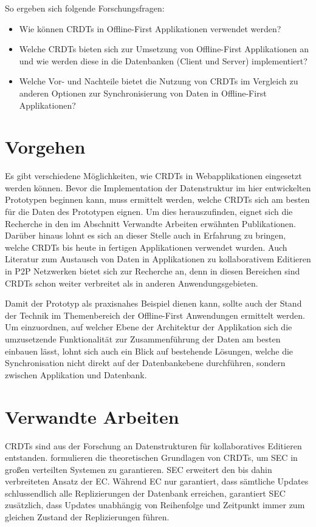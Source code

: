 \documentclass[a4paper, 12pt]{scrreprt}
\begin{document}
So ergeben sich folgende Forschungsfragen:

\begin{itemize}
	\item Wie können \acp{CRDT} in Offline-First Applikationen verwendet werden?
	\item Welche \acp{CRDT} bieten sich zur Umsetzung von Offline-First Applikationen an und wie werden diese in die Datenbanken (Client und Server) implementiert?
	\item Welche Vor- und Nachteile bietet die Nutzung von \acp{CRDT} im Vergleich zu anderen Optionen zur Synchronisierung von Daten in Offline-First Applikationen?
\end{itemize}

\section{Vorgehen}
Es gibt verschiedene Möglichkeiten, wie \acp{CRDT} in Webapplikationen eingesetzt werden können. Bevor die Implementation der Datenstruktur im hier entwickelten Prototypen beginnen kann, muss ermittelt werden, welche \acp{CRDT} sich am besten für die Daten des Prototypen eignen. Um dies herauszufinden, eignet sich die Recherche in den im Abschnitt Verwandte Arbeiten erwähnten Publikationen. Darüber hinaus lohnt es sich an dieser Stelle auch in Erfahrung zu bringen, welche \acp{CRDT} bis heute in fertigen Applikationen verwendet wurden. Auch Literatur zum Austausch von Daten in Applikationen zu kollaborativem Editieren in \ac{P2P} Netzwerken bietet sich zur Recherche an, denn in diesen Bereichen sind \acp{CRDT} schon weiter verbreitet als in anderen Anwendungsgebieten.

Damit der Prototyp als praxisnahes Beispiel dienen kann, sollte auch der Stand der Technik im Themenbereich der Offline-First Anwendungen ermittelt werden. Um einzuordnen, auf welcher Ebene der Architektur der Applikation sich die umzusetzende Funktionalität zur Zusammenführung der Daten am besten einbauen lässt, lohnt sich auch ein Blick auf bestehende Lösungen, welche die Synchronisation nicht direkt auf der Datenbankebene durchführen, sondern zwischen Applikation und Datenbank.

\section{Verwandte Arbeiten}
\label{sec:VerwandteArbeiten}

\acp{CRDT} sind aus der Forschung an Datenstrukturen für kollaboratives Editieren entstanden. \citet{InproceedingsCRDTOriginal} formulieren die theoretischen Grundlagen von \acp{CRDT}, um \ac{SEC} in großen verteilten Systemen zu garantieren. \ac{SEC} erweitert den bis dahin verbreiteten Ansatz der \ac{EC}. Während EC nur garantiert, dass sämtliche Updates schlussendlich alle Replizierungen der Datenbank erreichen, garantiert SEC zusätzlich, dass Updates unabhängig von Reihenfolge und Zeitpunkt immer zum gleichen Zustand der Replizierungen führen.
\end{document}
